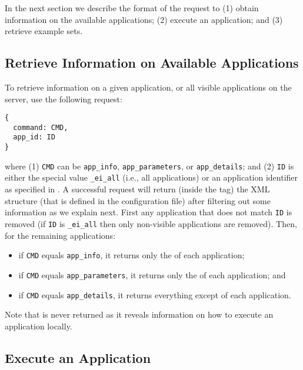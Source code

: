\bigskip 
%
In the next section we describe the format of the request to (1)
obtain information on the available applications; (2) execute an
application; and (3) retrieve example sets.

\subsection{Retrieve Information on Available Applications}

To retrieve information on a given application, or all visible
applications on the server, use the following request:

\bigskip
\begin{lstlisting}
{
  command: CMD,
  app_id: ID
}
\end{lstlisting}

\bigskip
\noindent
where (1) \texttt{CMD} can be \texttt{app\_info},
\texttt{app\_parameters}, or \texttt{app\_details}; and (2)
\texttt{ID} is either the special value \texttt{\_ei\_all} (i.e., all
applications) or an application identifier as specified in
.
%
A successful request will return (inside the  tag) the
XML structure  (that is defined in the
configuration file) after filtering out some information as we explain
next.
%
First any application that does not match \texttt{ID} is removed (if
\texttt{ID} is \texttt{\_ei\_all} then only non-visible applications
are removed). Then, for the remaining applications:
%
\begin{itemize}
%
\item if \texttt{CMD} equals \texttt{app\_info}, it returns only the
   of each application;
%
\item if \texttt{CMD} equals \texttt{app\_parameters}, it returns only the
   of each application; and
%
\item if \texttt{CMD} equals \texttt{app\_details}, it returns
  everything except  of each
  application.
%
\end{itemize}
%
Note that  is never returned as it
reveals information on how to execute an application locally.



\subsection{Execute an Application}

